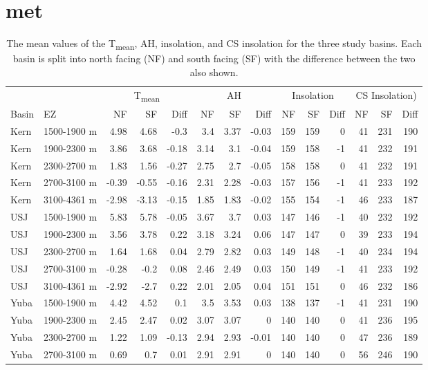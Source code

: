 \hypertarget{ch2-results-2}{\section{met}\label{ch2-results-2}}

\begin{table}[htbp]
\centering
\caption{The mean values of the T\textsubscript{mean}, AH, insolation, and CS insolation for the three study basins. Each basin is split into north facing (NF) and south facing (SF) with the difference between the two also shown.}
\label{tab:met_metric_table}
\tiny 
\begin{tabular}{llrrrrrrrrrrrr}
\toprule
& & \multicolumn{3}{c}{T\textsubscript{mean}} & \multicolumn{3}{c}{AH} & \multicolumn{3}{c}{Insolation} & \multicolumn{3}{c}{CS Insolation)} \\
\cmidrule(c){3-5} \cmidrule(lr){6-8} \cmidrule(lr){9-11} \cmidrule(lr){12-14} 
Basin & EZ & NF & SF & Diff & NF & SF & Diff & NF & SF & Diff & NF & SF & Diff \\
\midrule
Kern & 1500-1900 m & 4.98 & 4.68 & -0.3 & 3.4 & 3.37 & -0.03 & 159 & 159 & 0 & 41 & 231 & 190 \\
Kern & 1900-2300 m & 3.86 & 3.68 & -0.18 & 3.14 & 3.1 & -0.04 & 159 & 158 & -1 & 41 & 232 & 191 \\
Kern & 2300-2700 m & 1.83 & 1.56 & -0.27 & 2.75 & 2.7 & -0.05 & 158 & 158 & 0 & 41 & 232 & 191 \\
Kern & 2700-3100 m & -0.39 & -0.55 & -0.16 & 2.31 & 2.28 & -0.03 & 157 & 156 & -1 & 41 & 233 & 192 \\
Kern & 3100-4361 m & -2.98 & -3.13 & -0.15 & 1.85 & 1.83 & -0.02 & 155 & 154 & -1 & 46 & 233 & 187 \\
USJ & 1500-1900 m & 5.83 & 5.78 & -0.05 & 3.67 & 3.7 & 0.03 & 147 & 146 & -1 & 40 & 232 & 192 \\
USJ & 1900-2300 m & 3.56 & 3.78 & 0.22 & 3.18 & 3.24 & 0.06 & 147 & 147 & 0 & 39 & 233 & 194 \\
USJ & 2300-2700 m & 1.64 & 1.68 & 0.04 & 2.79 & 2.82 & 0.03 & 149 & 148 & -1 & 40 & 234 & 194 \\
USJ & 2700-3100 m & -0.28 & -0.2 & 0.08 & 2.46 & 2.49 & 0.03 & 150 & 149 & -1 & 41 & 233 & 192 \\
USJ & 3100-4361 m & -2.92 & -2.7 & 0.22 & 2.01 & 2.05 & 0.04 & 151 & 151 & 0 & 46 & 232 & 186 \\
Yuba & 1500-1900 m & 4.42 & 4.52 & 0.1 & 3.5 & 3.53 & 0.03 & 138 & 137 & -1 & 41 & 231 & 190 \\
Yuba & 1900-2300 m & 2.45 & 2.47 & 0.02 & 3.07 & 3.07 & 0 & 140 & 140 & 0 & 41 & 236 & 195 \\
Yuba & 2300-2700 m & 1.22 & 1.09 & -0.13 & 2.94 & 2.93 & -0.01 & 140 & 140 & 0 & 47 & 236 & 189 \\
Yuba & 2700-3100 m & 0.69 & 0.7 & 0.01 & 2.91 & 2.91 & 0 & 140 & 140 & 0 & 56 & 246 & 190 \\
\bottomrule
\end{tabular}
\end{table}


